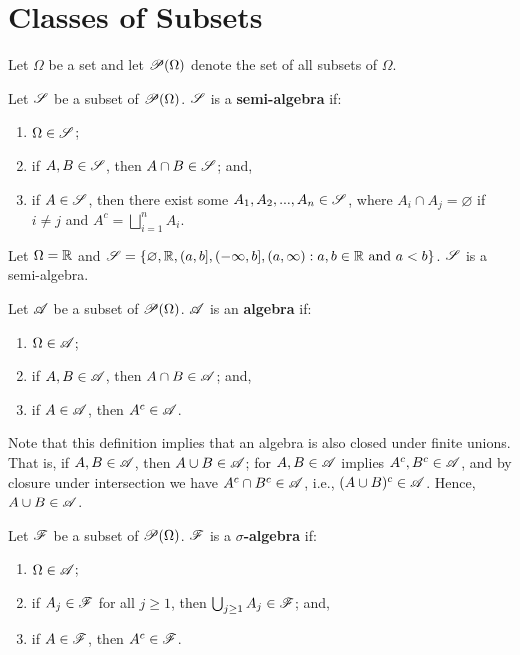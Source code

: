 \section{Classes of Subsets}

\noindent
Let $\Omega$ be a set and let $\mathscr{P}(\Omega)$ denote the set of all subsets of $\Omega$. 

\begin{definition}
  Let $\mathscr{S}$ be a subset of $\mathscr{P}(\Omega)$. $\mathscr{S}$ is a \textbf{semi-algebra} if:
  \begin{enumerate}
    \item $\Omega \in \mathscr{S}$;
    \item if $A, B \in \mathscr{S}$, then $A \cap B \in \mathscr{S}$; and,
    \item if $A \in \mathscr{S}$, then there exist some $A_1, A_2, ..., A_n \in \mathscr{S}$, where $A_i \cap A_j = \varnothing$ if $i \neq j$ and $A^c = \bigsqcup_{i = 1}^{n} A_i$.
  \end{enumerate}
\end{definition}

\begin{example}
  Let $\Omega = \mathbb{R}$ and $\mathscr{S} = \{ \varnothing, \mathbb{R}, (a, b], (-\infty, b], (a, \infty) : a, b \in \mathbb{R} \text{ and } a < b \}$. $\mathscr{S}$ is a semi-algebra.
\end{example}

\begin{definition}
  Let $\mathscr{A}$ be a subset of $\mathscr{P}(\Omega)$. $\mathscr{A}$ is an \textbf{algebra} if:
  \begin{enumerate}
    \item $\Omega \in \mathscr{A}$;
    \item if $A, B \in \mathscr{A}$, then $A \cap B \in \mathscr{A}$; and,
    \item if $A \in \mathscr{A}$, then $A^c \in \mathscr{A}$.
  \end{enumerate}
\end{definition}

Note that this definition implies that an algebra is also closed under finite unions. That is, if $A, B \in \mathscr{A}$, then $A \cup B \in \mathscr{A}$; for $A, B \in \mathscr{A}$ implies $A^c, B^c \in \mathscr{A}$, and by closure under intersection we have $A^c \cap B^c \in \mathscr{A}$, i.e., $(A \cup B)^c \in \mathscr{A}$. Hence, $A \cup B \in \mathscr{A}$.

\begin{definition}
  Let $\mathscr{F}$ be a subset of $\mathscr{P}(\Omega)$. $\mathscr{F}$ is a \textbf{$\sigma$-algebra} if:
  \begin{enumerate}
    \item $\Omega \in \mathscr{A}$;
    \item if $A_j \in \mathscr{F}$ for all $j \geq 1$, then $\bigcup_{j \geq 1} A_j \in \mathscr{F}$; and,
    \item if $A \in \mathscr{F}$, then $A^c \in \mathscr{F}$.
  \end{enumerate}
\end{definition}

